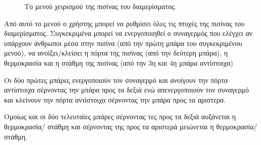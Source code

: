 \documentclass[a4paper,titlepage,twoside,12pt,leqno]{article}
\begin{document}
\begin{figure}
\begin{center}
\caption{Το μενού χειρισμού της πισίνας του διαμερίσματος.}
\label{fig:menu:pool}
\end{center}
\end{figure}

Από αυτό το μενού ο χρήστης μπορεί να ρυθμίσει όλες τις πτυχές της πισίνας του διαμερίσματος. Συγκεκριμένα μπορεί να ενεργοποιηθεί ο συναγερμός που ελέγχει αν υπάρχουν άνθρωποι μέσα στην πισίνα (από την πρώτη μπάρα του συγκεκριμένου μενού), να ανοίξει/κλείσει η πόρτα της πισίνας (από την δεύτερη μπάρα), η θερμοκρασία και η στάθμη της πισίνας (από την 3η και 4η μπάρα αντίστοιχα)

Οι δύο πρώτες μπάρες ενεργοποιούν τον συναγερμό και ανοίγουν την πόρτα αντίστοιχα σέρνοντας την μπάρα προς τα δεξιά ενώ απενεργοποιούν τον συναγερμό και κλείνουν την πόρτα αντίστοιχα σέρνοντας την μπάρα προς τα αριστερα.

Ομοίως και οι δύο τελευταίες μπάρες σέρνοντας τες προς τα δεξιά αυξάνεται η θερμοκρασία/ στάθμη και σέρνοντας της προς τα αριστερά μειώνεται η θερμοκρασία/στάθμη.

\end{document}
